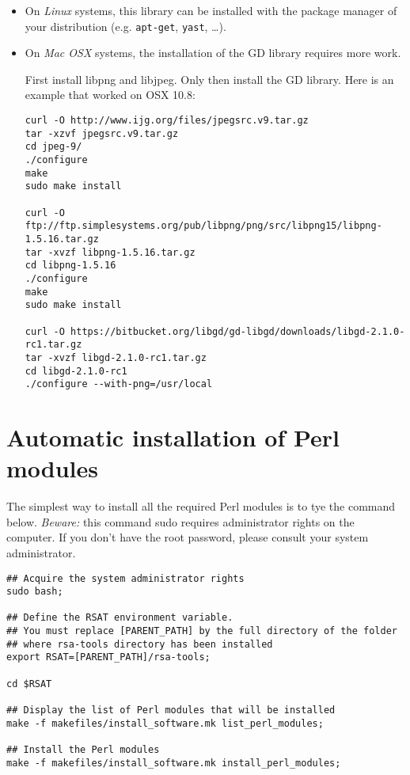 \documentclass[12pt,a4paper, oneside]{scrreprt} %
\begin{document}
\begin{itemize}

\item On \emph{Linux} systems, this library can be installed with the
  package manager of your distribution (e.g. \texttt{apt-get},
  \texttt{yast}, \ldots).

\item On \emph{Mac OSX} systems, the installation of the GD library requires more work.

First install libpng and libjpeg. Only then install the GD library. Here is an example that worked on OSX 10.8:
\begin{lstlisting}
curl -O http://www.ijg.org/files/jpegsrc.v9.tar.gz
tar -xzvf jpegsrc.v9.tar.gz 
cd jpeg-9/
./configure
make
sudo make install

curl -O ftp://ftp.simplesystems.org/pub/libpng/png/src/libpng15/libpng-1.5.16.tar.gz
tar -xvzf libpng-1.5.16.tar.gz 
cd libpng-1.5.16
./configure
make
sudo make install

curl -O https://bitbucket.org/libgd/gd-libgd/downloads/libgd-2.1.0-rc1.tar.gz
tar -xvzf libgd-2.1.0-rc1.tar.gz
cd libgd-2.1.0-rc1
./configure --with-png=/usr/local
\end{lstlisting}

\end{itemize}

\section{Automatic installation of Perl modules}

The simplest way to install all the required Perl modules is to tye
the command below. \emph{Beware:} this command sudo requires
administrator rights on the computer. If you don't have the root
password, please consult your system administrator.

\begin{lstlisting}
## Acquire the system administrator rights
sudo bash;

## Define the RSAT environment variable.
## You must replace [PARENT_PATH] by the full directory of the folder
## where rsa-tools directory has been installed
export RSAT=[PARENT_PATH]/rsa-tools;

cd $RSAT

## Display the list of Perl modules that will be installed
make -f makefiles/install_software.mk list_perl_modules;

## Install the Perl modules
make -f makefiles/install_software.mk install_perl_modules;
\end{lstlisting}
\end{document}
